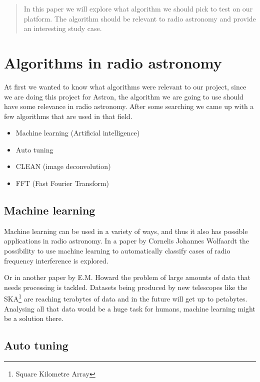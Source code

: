 \documentclass[11pt, A4, oneside]{article}
\begin{document}
\begin{abstract}
	
In this paper we will explore what algorithm we should pick to test on our platform. The algorithm should be relevant to radio astronomy and provide an interesting study case. 
	
\end{abstract}

\tableofcontents

\newpage

\section{Algorithms in radio astronomy}

At first we wanted to know what algorithms were relevant to our project, since we are doing this project for Astron\cite{astron}, the algorithm we are going to use should have some relevance in radio astronomy. After some searching we came up with a few algorithms that are used in that field.
\begin{itemize}
	\item Machine learning (Artificial intelligence)
	\item Auto tuning
	\item CLEAN (image deconvolution)
	\item FFT (Fast Fourier Transform)
\end{itemize}

\subsection{Machine learning}

Machine learning can be used in a variety of ways, and thus it also has possible applications in radio astronomy. In a paper by Cornelis Johannes Wolfaardt\cite{Machine_learning} the possibility to use machine learning to automatically classify cases of radio frequency interference is explored. \par 
Or in another paper by E.M. Howard\cite{Data_analysing} the problem of large amounts of data that needs processing is tackled. Datasets being produced by new telescopes like the SKA\footnote{Square Kilometre Array} are reaching terabytes of data and in the future will get up to petabytes. Analysing all that data would be a huge task for humans, machine learning might be a solution there. 

\subsection{Auto tuning}
\end{document}
